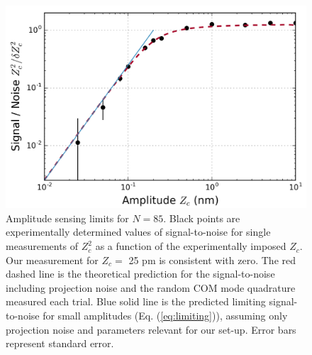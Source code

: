 \documentclass[aps,prl,twocolumn,superscriptaddress,floatfix]{revtex4-1}
\begin{document}
\begin{figure}
\includegraphics[width=\columnwidth]{sensing_limit}
\caption{Amplitude sensing limits for $N=85$. Black points are experimentally determined values of signal-to-noise for single measurements of $Z_{c}^{2}$ as a function of the experimentally imposed $Z_c$. Our measurement for $Z_c =$ 25 pm is consistent with zero. The red dashed line is the theoretical prediction for the signal-to-noise including projection noise and the random COM mode quadrature measured each trial. Blue solid line is the predicted limiting signal-to-noise for small amplitudes (Eq. (\ref{eq:limiting})), assuming only projection noise and parameters relevant for our set-up. Error bars represent standard error.} \label{Fig_sens}
\end{figure}
\end{document}
